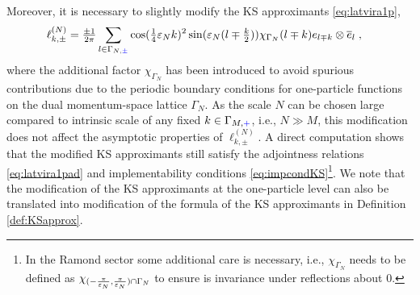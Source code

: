 \documentclass[a4paper, 11pt]{article}
\DeclareMathOperator{\1}{\mathds{1}}
\begin{document}
Moreover, it is necessary to slightly modify the KS approximants \eqref{eq:latvira1p},
\begin{align}
\label{eq:latvirachi1pmommod}
\ell^{(N)}_{k,\pm} & = \tfrac{\pm1}{2\pi}\sum_{l\in\Gamma_{N,{\color{blue}\pm}}} \cos(\tfrac{1}{4}\varepsilon_{N}k)^{2}\sin(\varepsilon_{N}(l\mp\tfrac{k}{2}))\chi_{\Gamma_{N}}(l\mp k)e_{l\mp k}\otimes \overline{e}_{l}\;,
\end{align}
where the additional factor $\chi_{\Gamma_{N}}$ has been introduced to avoid spurious contributions due to the periodic boundary conditions for one-particle functions on the dual momentum-space lattice $\Gamma_{N}$. As the scale $N$ can be chosen large compared to intrinsic scale of any fixed $k\in\Gamma_{M,{\color{blue}+}}$, i.e., $N\gg M$, this modification does not affect the asymptotic properties of $\ell^{(N)}_{k,\pm}$. A direct computation shows that the modified KS approximants still satisfy the adjointness relations \eqref{eq:latvira1pad} and implementability conditions \eqref{eq:impcondKS}\footnote{In the Ramond sector some additional care is necessary, i.e., $\chi_{\Gamma_{N}}$ needs to be defined as $\chi_{(-\frac{\pi}{\varepsilon_{N}},\frac{\pi}{\varepsilon_{N}})\cap \Gamma_{N}}$ to ensure is invariance under reflections about $0$.}. We note that the modification of the KS approximants at the one-particle level can also be translated into modification of the formula of the KS approximants in Definition \ref{def:KSapprox}.

\bigskip
\end{document}
